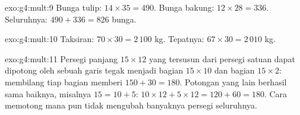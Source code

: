 \begin{solution}{exo:g4:mult:9}
Bunga tulip: $14 \times 35 = 490$. Bunga bakung: $12 \times 28 = 336$.
Seluruhnya: $490 + 336 = 826$ bunga.
\end{solution}

\begin{solution}{exo:g4:mult:10}
Taksiran: $70 \times 30 = 2\,100$ kg. Tepatnya:
$67 \times 30 = 2\,010$ kg.
\end{solution}

\begin{solution}{exo:g4:mult:11}
Persegi panjang $15 \times 12$ yang tersusun dari persegi satuan
dapat dipotong oleh sebuah garis tegak menjadi bagian
$15 \times 10$ dan bagian $15 \times 2$: membilang tiap bagian
memberi $150 + 30 = 180$. Potongan yang lain berhasil sama baiknya,
misalnya $15 = 10 + 5$: $10 \times 12 + 5 \times 12 = 120 + 60
= 180$. Cara memotong mana pun tidak mengubah banyaknya persegi
seluruhnya.

\end{solution}
